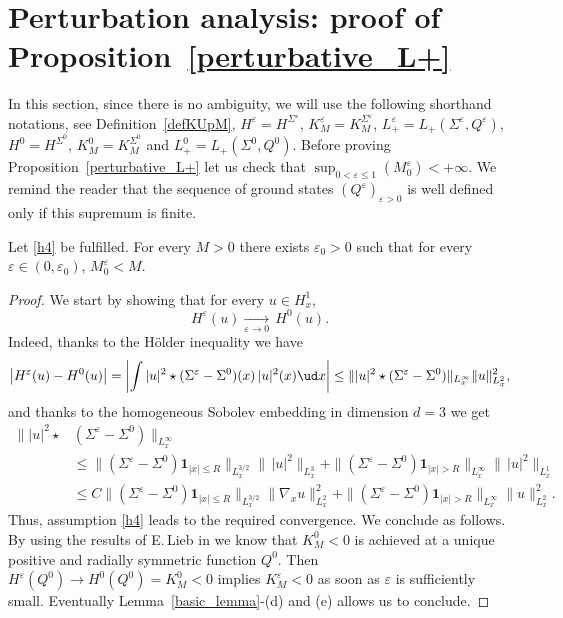 \section{Perturbation analysis: proof of Proposition~\ref{perturbative_L+}}\label{Perturbative}

In this section, since there is no ambiguity, we will use the following shorthand notations, see Definition~\ref{defKUpM}, $H^{\varepsilon}=H^{\Sigma^{\varepsilon}}$, $K_{M}^{\varepsilon}=K_{M}^{\Sigma^{\varepsilon}}$, $L_{+}^{\varepsilon}=L_{+}(\Sigma^{\varepsilon},Q^{\varepsilon})$, $H^{0}=H^{\Sigma^{0}}$, $K_{M}^{0}=K_{M}^{\Sigma^{0}}$ and $L_{+}^{0}=L_{+}(\Sigma^{0},Q^{0})$. Before proving Proposition~\ref{perturbative_L+} let us check that $\sup_{0<\varepsilon\leq 1}(M_{0}^{\varepsilon})<+\infty$. We remind the reader that the sequence of ground states $(Q^{\varepsilon})_{\varepsilon>0}$ is well defined only if this supremum is finite.

\begin{lemma}\label{Lemma_mass_threshold}
Let \eqref{h4} be fulfilled. For every $M>0$ there exists $\varepsilon_{0}>0$ such that for every $\varepsilon\in(0,\varepsilon_{0})$, $M_{0}^{\varepsilon}<M$.
\end{lemma}
\begin{proof}
We start by showing that for every $u\in H_{x}^{1}$,
\[
H^{\varepsilon}(u)\underset{\varepsilon\to 0}{\to}\,H^{0}(u).
\]
Indeed, thanks to the Hölder inequality we have
\[
\left|H^{\varepsilon}(u)-H^{0}(u)\right|=\left|\int|u|^{2}\star(\Sigma^{\varepsilon}-\Sigma^{0})(x)\,|u|^{2}(x)\ud x\right|\leq\||u|^{2}\star(\Sigma^{\varepsilon}-\Sigma^{0})\|_{L_{x}^{\infty}}\|u\|_{L_{x}^{2}}^{2},
\]
and thanks to the homogeneous Sobolev embedding in dimension $d=3$ we get
\begin{align*}
\||u|^{2}\star{}&(\Sigma^{\varepsilon}-\Sigma^{0})\|_{L_{x}^{\infty}}\\
&\leq \|(\Sigma^{\varepsilon}-\Sigma^{0})\mathbf{1}_{|x|\leq R}\|_{L_{x}^{3/2}}\|\,|u|^{2}\|_{L_{x}^{3}}+\|(\Sigma^{\varepsilon}-\Sigma^{0})\mathbf{1}_{|x|>R}\|_{L_{x}^{\infty}}\|\,|u|^{2}\|_{L_{x}^{1}}\\
&\leq C\|(\Sigma^{\varepsilon}-\Sigma^{0})\mathbf{1}_{|x|\leq R}\|_{L_{x}^{3/2}}\|\nabla_{x}u\|_{L_{x}^{2}}^{2}+\|(\Sigma^{\varepsilon}-\Sigma^{0})\mathbf{1}_{|x|>R}\|_{L_{x}^{\infty}}\|u\|_{L_{x}^{2}}^{2}.
\end{align*}
Thus, assumption \eqref{h4} leads to the required convergence. We conclude as follows. By using the results of E.\,Lieb in \cite{Lieb_Choquard} we know that $K_{M}^{0}<0$ is achieved at a unique positive and radially symmetric function $Q^{0}$. Then $H^{\varepsilon}(Q^{0})\to H^{0}(Q^{0})=K_{M}^{0}<0$ implies $K_{M}^{\varepsilon}<0$ as soon as $\varepsilon$ is sufficiently small. Eventually Lemma~\ref{basic_lemma}-(d) and (e) allows us to conclude.
\end{proof}


